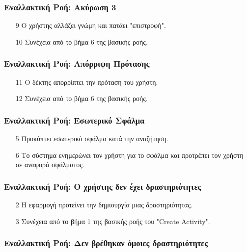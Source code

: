 \documentclass[11pt]{article}
\begin{document}
\subsubsection{Εναλλακτική Ροή: Ακύρωση 3}

\begin{enumerate}
    \item[9] Ο χρήστης αλλάζει γνώμη και πατάει "επιστροφή".
    \item[10] Συνέχεια από το βήμα 6 της βασικής ροής.
\end{enumerate}

\subsubsection{Εναλλακτική Ροή: Απόρριψη Πρότασης}

\begin{enumerate}
    \item[11] Ο δέκτης απορρίπτει την πρόταση του χρήστη.
    \item[12] Συνέχεια από το βήμα 6 της βασικής ροής.
\end{enumerate}


\subsubsection{Εναλλακτική Ροή: Εσωτερικό Σφάλμα}

\begin{enumerate}
    \item[5] Προκύπτει εσωτερικό σφάλμα κατά την αναζήτηση.
    \item[6] Το σύστημα ενημερώνει τον χρήστη για το σφάλμα και προτρέπει τον
        χρήστη σε αναφορά σφάλματος.
\end{enumerate}

\subsubsection{Εναλλακτική Ροή: Ο χρήστης δεν έχει δραστηριότητες}

\begin{enumerate}
    \item[2] Η εφαρμογή προτείνει την δημιουργία μιας δραστηριότητας.
    \item[3] Συνέχεια από το βήμα 1 της βασικής ροής του "Create Activity".
\end{enumerate}

\subsubsection{Εναλλακτική Ροή: Δεν βρέθηκαν όμοιες δραστηριότητες}
\end{document}
